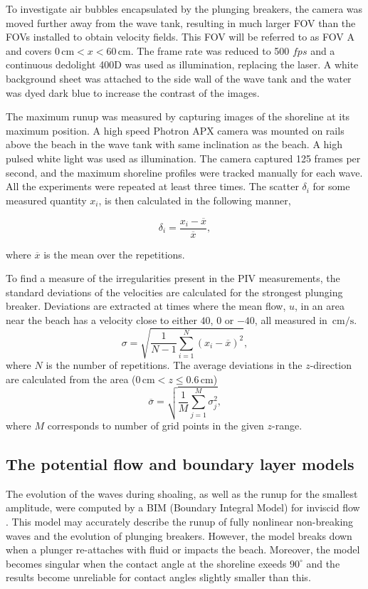 \documentclass[review, authoryear]{elsarticle}
\newcommand{\cm}{\,\mbox{cm}}
\newcommand{\cmps}{\,\mbox{cm/s}}
\begin{document}
To investigate air bubbles encapsulated by the plunging breakers, the camera was moved further away from the wave tank, resulting in much larger FOV than the FOVs installed to obtain velocity fields. This FOV will be referred to as FOV A and covers $0\cm< x <60\cm$. The frame rate was reduced to  500 $fps$  
and a continuous dedolight 400D was used as illumination, replacing the laser. A white background sheet was attached to the side wall of the wave tank and the water was dyed dark blue to increase the contrast of the images.

The maximum runup was measured by capturing images of the shoreline at its maximum position. A high speed Photron APX  camera was mounted on rails above the beach in the wave tank with same inclination as the beach. A high pulsed white light was used as illumination. The camera captured 125 frames per second, and the maximum shoreline profiles were tracked manually for each wave. All the experiments were repeated at least three times. The scatter $\delta_i$ for some measured quantity $x_i$, is then calculated in the following manner,

\begin{equation}
\delta_i=\frac{x_i-\overline{x}}{\overline{x}},
\end{equation}

where $\overline{x}$ is the mean over the repetitions.


To find a measure of the irregularities present in the PIV measurements, the standard deviations of the velocities are calculated for the strongest plunging breaker. Deviations are extracted at times where the mean flow, $u$, in an area near the beach has a velocity close to either
$40$, $0$ or $-40$, all measured in $\cmps$.
\begin{equation}
\sigma=\sqrt{\frac{1}{N-1}\sum_{i=1}^{N}(x_i-\overline{x})^2}, 
\end{equation}
where $N$ is the number of repetitions.
The average deviations in the $z$-direction are calculated from the area ($0\cm < z \le 0.6\cm$)
\begin{equation}
\overline{\sigma}=\sqrt{\frac{1}{M}\sum_{j=1}^{M}\sigma_j^2},
\label{av_g}
\end{equation}
where $M$ corresponds to number of  grid points in the given $z$-range.

\subsection{The potential flow and boundary layer models}
The evolution of the waves during shoaling, as well as the runup for the smallest amplitude, were 
computed by a BIM (Boundary Integral Model) for  inviscid flow \citep{pedersen2013runup}. This model may accurately describe the runup of fully nonlinear non-breaking waves and the evolution of plunging breakers.
However, the model breaks down when a plunger re-attaches with fluid or impacts the beach. Moreover, the
model  becomes singular when the contact angle at the shoreline exeeds $90^\circ$  and the results  become unreliable for contact angles slightly smaller than this.  
\end{document}
